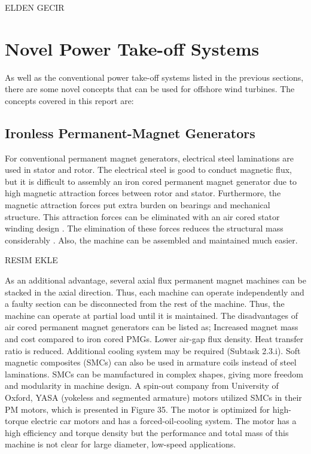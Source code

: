 \documentclass[a4paper, 11pt]{article} %
\begin{document}
ELDEN GECIR

\section{Novel Power Take-off Systems}

As well as the conventional power take-off systems listed in the previous sections, there are some novel concepts that can be used for offshore wind turbines. The concepts covered in this report are:

\subsection{Ironless Permanent-Magnet Generators}

For conventional permanent magnet generators, electrical steel laminations are used in stator and rotor. The electrical steel is good to conduct magnetic flux, but it is difficult to assembly an iron cored permanent magnet generator due to high magnetic attraction forces between rotor and stator. Furthermore, the magnetic attraction forces put extra burden on bearings and mechanical structure. This attraction forces can be eliminated with an air cored stator winding design \cite{Mueller2009}. The elimination of these forces reduces the structural mass considerably \cite{McDonald2008b}. Also, the machine can be assembled and maintained much easier. 


RESIM EKLE

As an additional advantage, several axial flux permanent magnet machines can be stacked in the axial direction. Thus, each machine can operate independently and a faulty section can be disconnected from the rest of the machine. Thus, the machine can operate at partial load until it is maintained. 
The disadvantages of air cored permanent magnet generators can be listed as;
Increased magnet mass and cost compared to iron cored PMGs.
Lower air-gap flux density.
Heat transfer ratio is reduced. Additional cooling system may be required (Subtask 2.3.i).
Soft magnetic composites (SMCs) can also be used in armature coils instead of steel laminations. SMCs can be manufactured in complex shapes, giving more freedom and modularity in machine design. A spin-out company from University of Oxford, YASA (yokeless and segmented armature) motors utilized SMCs in their PM motors, which is presented in Figure 35. The motor is optimized for high-torque electric car motors and has a forced-oil-cooling system. The motor has a high efficiency and torque density but the performance and total mass of this machine is not clear for large diameter, low-speed applications.
\end{document}
